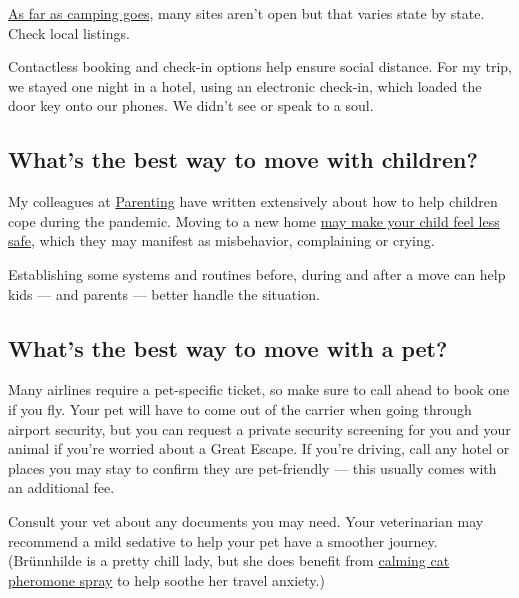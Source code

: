 \href{https://www.nytimes3xbfgragh.onion/2020/05/28/travel/camping-west-coast.html}{As
far as camping goes}, many sites aren't open but that varies state by
state. Check local listings.

Contactless booking and check-in options help ensure social distance.
For my trip, we stayed one night in a hotel, using an electronic
check-in, which loaded the door key onto our phones. We didn't see or
speak to a soul.

\hypertarget{whats-the-best-way-to-move-with-children}{%
\subsection{What's the best way to move with
children?}\label{whats-the-best-way-to-move-with-children}}

My colleagues at
\href{https://www.nytimes3xbfgragh.onion/section/parenting}{Parenting}
have written extensively about how to help children cope during the
pandemic. Moving to a new home
\href{https://www.nytimes3xbfgragh.onion/2020/07/13/parenting/moving-tips-kids.html}{may
make your child feel less safe}, which they may manifest as misbehavior,
complaining or crying.

Establishing some systems and routines before, during and after a move
can help kids --- and parents --- better handle the situation.

\hypertarget{whats-the-best-way-to-move-with-a-pet}{%
\subsection{What's the best way to move with a
pet?}\label{whats-the-best-way-to-move-with-a-pet}}

Many airlines require a pet-specific ticket, so make sure to call ahead
to book one if you fly. Your pet will have to come out of the carrier
when going through airport security, but you can request a private
security screening for you and your animal if you're worried about a
Great Escape. If you're driving, call any hotel or places you may stay
to confirm they are pet-friendly --- this usually comes with an
additional fee.

Consult your vet about any documents you may need. Your veterinarian may
recommend a mild sedative to help your pet have a smoother journey.
(Brünnhilde is a pretty chill lady, but she does benefit from
\href{https://www.feliway.com/us/Products/feliway-classic-spray}{calming
cat pheromone spray} to help soothe her travel anxiety.)

